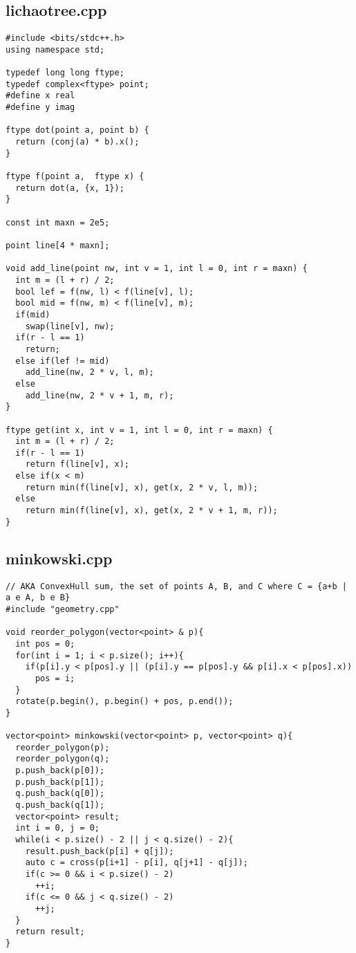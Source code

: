 \documentclass[11pt,landscape,twocolumn]{article}
\begin{document}
\subsection*{lichaotree.cpp}
\begin{lstlisting}
#include <bits/stdc++.h>
using namespace std;

typedef long long ftype;
typedef complex<ftype> point;
#define x real
#define y imag

ftype dot(point a, point b) {
  return (conj(a) * b).x();
}

ftype f(point a,  ftype x) {
  return dot(a, {x, 1});
}

const int maxn = 2e5;

point line[4 * maxn];

void add_line(point nw, int v = 1, int l = 0, int r = maxn) {
  int m = (l + r) / 2;
  bool lef = f(nw, l) < f(line[v], l);
  bool mid = f(nw, m) < f(line[v], m);
  if(mid) 
    swap(line[v], nw);
  if(r - l == 1) 
    return;
  else if(lef != mid) 
    add_line(nw, 2 * v, l, m);
  else 
    add_line(nw, 2 * v + 1, m, r);
}

ftype get(int x, int v = 1, int l = 0, int r = maxn) {
  int m = (l + r) / 2;
  if(r - l == 1) 
    return f(line[v], x);
  else if(x < m) 
    return min(f(line[v], x), get(x, 2 * v, l, m));
  else 
    return min(f(line[v], x), get(x, 2 * v + 1, m, r));
}
\end{lstlisting}

\subsection*{minkowski.cpp}
\begin{lstlisting}
// AKA ConvexHull sum, the set of points A, B, and C where C = {a+b | a e A, b e B}
#include "geometry.cpp"

void reorder_polygon(vector<point> & p){
  int pos = 0;
  for(int i = 1; i < p.size(); i++){
    if(p[i].y < p[pos].y || (p[i].y == p[pos].y && p[i].x < p[pos].x))
      pos = i;
  }
  rotate(p.begin(), p.begin() + pos, p.end());
}

vector<point> minkowski(vector<point> p, vector<point> q){
  reorder_polygon(p);
  reorder_polygon(q);
  p.push_back(p[0]);
  p.push_back(p[1]);
  q.push_back(q[0]);
  q.push_back(q[1]);
  vector<point> result;
  int i = 0, j = 0;
  while(i < p.size() - 2 || j < q.size() - 2){
    result.push_back(p[i] + q[j]);
    auto c = cross(p[i+1] - p[i], q[j+1] - q[j]);
    if(c >= 0 && i < p.size() - 2)
      ++i;
    if(c <= 0 && j < q.size() - 2)
      ++j;
  }
  return result;
}
\end{lstlisting}
\end{document}

